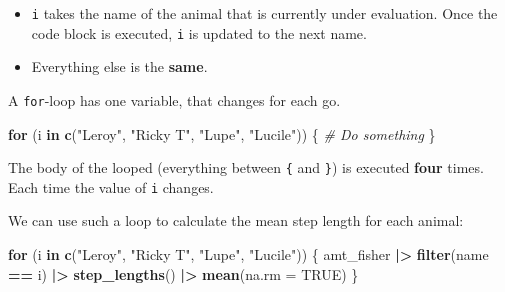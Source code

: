 \documentclass[ignorenonframetext,,t]{beamer}
\let\oldtextbf\textbf
\renewcommand{\textbf}[1]{\textcolor{spamwell}{\oldtextbf{#1}}}
\providecommand{\tightlist}{%
\setlength{\itemsep}{0pt}\setlength{\parskip}{0pt}}
\newenvironment{Shaded}{\begin{snugshade}}{\end{snugshade}}
\newcommand{\AttributeTok}[1]{\textcolor[rgb]{0.13,0.29,0.53}{#1}}
\newcommand{\CommentTok}[1]{\textcolor[rgb]{0.56,0.35,0.01}{\textit{#1}}}
\newcommand{\ConstantTok}[1]{\textcolor[rgb]{0.56,0.35,0.01}{#1}}
\newcommand{\ControlFlowTok}[1]{\textcolor[rgb]{0.13,0.29,0.53}{\textbf{#1}}}
\newcommand{\FunctionTok}[1]{\textcolor[rgb]{0.13,0.29,0.53}{\textbf{#1}}}
\newcommand{\NormalTok}[1]{#1}
\newcommand{\SpecialCharTok}[1]{\textcolor[rgb]{0.81,0.36,0.00}{\textbf{#1}}}
\newcommand{\StringTok}[1]{\textcolor[rgb]{0.31,0.60,0.02}{#1}}
\providecommand{\tightlist}{%
\setlength{\itemsep}{0pt}\setlength{\parskip}{0pt}}
\renewcommand{\tightlist}{\setlength{\itemsep}{1.4ex}\setlength{\parskip}{0pt}}
\begin{document}
\begin{frame}[fragile]
\begin{itemize}
\tightlist
\item
  \texttt{i} takes the name of the animal that is currently under
  evaluation. Once the code block is executed, \texttt{i} is updated to
  the next name.
\item
  Everything else is the \textbf{same}.
\end{itemize}

A \texttt{for}-loop has one variable, that changes for each go.

\begin{Shaded}
\begin{Highlighting}[]
\ControlFlowTok{for}\NormalTok{ (i }\ControlFlowTok{in} \FunctionTok{c}\NormalTok{(}\StringTok{"Leroy"}\NormalTok{, }\StringTok{"Ricky T"}\NormalTok{, }\StringTok{"Lupe"}\NormalTok{, }\StringTok{"Lucile"}\NormalTok{)) \{}
  \CommentTok{\# Do something}
\NormalTok{\}}
\end{Highlighting}
\end{Shaded}

The body of the looped (everything between \texttt{\{} and \texttt{\}})
is executed \textbf{four} times. Each time the value of \texttt{i}
changes.
\end{frame}

\begin{frame}[fragile]
We can use such a loop to calculate the mean step length for each
animal:

\begin{Shaded}
\begin{Highlighting}[]
\ControlFlowTok{for}\NormalTok{ (i }\ControlFlowTok{in} \FunctionTok{c}\NormalTok{(}\StringTok{"Leroy"}\NormalTok{, }\StringTok{"Ricky T"}\NormalTok{, }\StringTok{"Lupe"}\NormalTok{, }\StringTok{"Lucile"}\NormalTok{)) \{}
\NormalTok{  amt\_fisher }\SpecialCharTok{|\textgreater{}} \FunctionTok{filter}\NormalTok{(name }\SpecialCharTok{==}\NormalTok{ i) }\SpecialCharTok{|\textgreater{}} 
    \FunctionTok{step\_lengths}\NormalTok{() }\SpecialCharTok{|\textgreater{}} \FunctionTok{mean}\NormalTok{(}\AttributeTok{na.rm =} \ConstantTok{TRUE}\NormalTok{)}
\NormalTok{\}}
\end{Highlighting}
\end{Shaded}
\end{frame}
\end{document}
